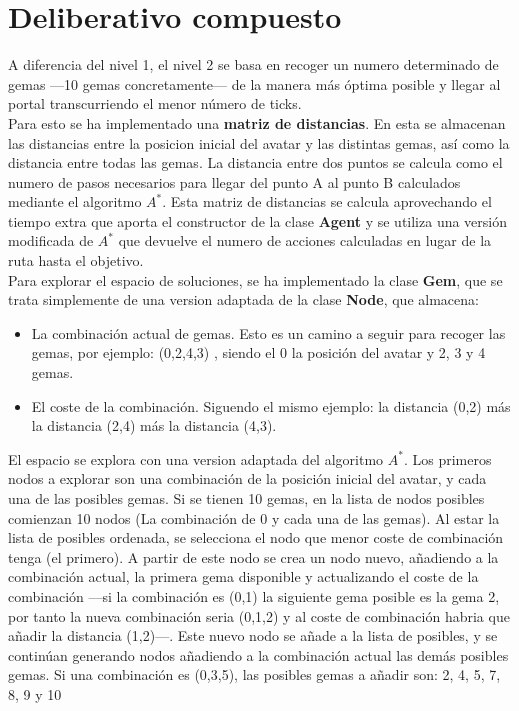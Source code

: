 \section{Deliberativo compuesto}
A diferencia del nivel 1, el nivel 2 se basa en recoger un numero determinado de gemas ---10 gemas concretamente--- de la manera más óptima posible y llegar al portal transcurriendo el menor número de ticks.
\\
Para esto se ha implementado una \textbf{matriz de distancias}. En esta se almacenan las distancias entre la posicion inicial del avatar y las distintas gemas, así como la distancia entre todas las gemas. La distancia entre dos puntos se calcula como el numero de pasos necesarios para llegar del punto A al punto B calculados mediante el algoritmo $ A^{*} $. Esta matriz de distancias se calcula aprovechando el tiempo extra que aporta el constructor de la clase \textbf{Agent} y se utiliza una versión modificada de $ A^{*} $ que devuelve el numero de acciones calculadas en lugar de la ruta hasta el objetivo.\\
Para explorar el espacio de soluciones, se ha implementado la clase \textbf{Gem}, que se trata simplemente de una version adaptada de la clase \textbf{Node}, que almacena:
\begin{itemize}
   \item La combinación actual de gemas. Esto es un camino a seguir para recoger las gemas, por ejemplo: (0,2,4,3) , siendo el 0 la posición del avatar y 2, 3 y 4 gemas.
   \item El coste de la combinación. Siguendo el mismo ejemplo: la distancia (0,2) más la distancia (2,4) más la distancia (4,3).
\end{itemize}
El espacio se explora con una version adaptada del algoritmo $ A^{*} $. Los primeros nodos a explorar son una combinación de la posición inicial del avatar, y cada una de las posibles gemas. Si se tienen 10 gemas, en la lista de nodos posibles comienzan 10 nodos (La combinación de 0 y cada una de las gemas). Al estar la lista de posibles ordenada, se selecciona el nodo que menor coste de combinación tenga (el primero). A partir de este nodo se crea un nodo nuevo, añadiendo a la combinación actual, la primera gema disponible y actualizando el coste de la combinación  ---si la combinación es (0,1) la siguiente gema posible es la gema 2, por tanto la nueva combinación seria (0,1,2) y al coste de combinación habria que añadir la distancia (1,2)---. Este nuevo nodo se añade a la lista de posibles, y se continúan generando nodos añadiendo a la combinación actual las demás posibles gemas. Si una combinación es (0,3,5), las posibles gemas a añadir son: 2, 4, 5, 7, 8, 9 y 10\\

